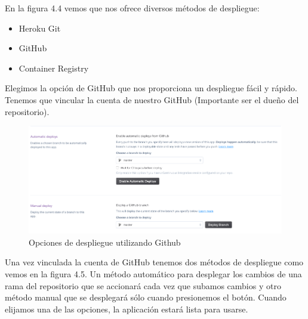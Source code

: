 En la figura 4.4 vemos que nos ofrece diversos métodos de despliegue:
\begin{itemize}
    \item Heroku Git
    \item GitHub
    \item Container Registry
\end{itemize}
Elegimos la opción de GitHub que nos proporciona un despliegue fácil y rápido. Tenemos que vincular la cuenta de nuestro GitHub (Importante ser el dueño del repositorio).
\begin{figure}[H]
    \centering
    \includegraphics[width=6in]{figures/chapter-4/heroku_4.png}
    \caption{Opciones de despliegue utilizando Github}
\end{figure}
Una vez vinculada la cuenta de GitHub tenemos dos métodos de despliegue como vemos en la figura 4.5. Un método automático para desplegar los cambios de una rama del repositorio que se accionará cada vez que subamos cambios y otro método manual que se desplegará sólo cuando presionemos el botón. 
Cuando elijamos una de las opciones, la aplicación estará lista para usarse.

